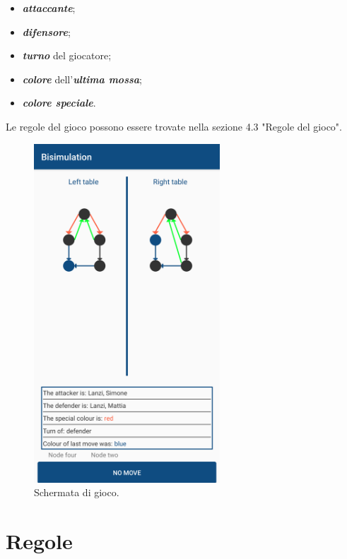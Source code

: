 \documentclass[a4paper,11pt,twoside,openright]{report}
\begin{document}
\begin{itemize}
\item \textbf\textit{attaccante};

\item \textbf\textit{difensore};

\item \textbf\textit{turno} del giocatore;

\item \textbf\textit{colore} dell'\textbf\textit{ultima mossa};

\item \textbf\textit{colore speciale}.
\end{itemize}

 Le regole del gioco possono essere trovate nella sezione 4.3 "Regole del gioco".

\begin{figure}[h]
\centering
\includegraphics[width=\linewidth,height=360pt,keepaspectratio]{images/Game.png}
\caption{Schermata di gioco.}
\end{figure}

\section{Regole}
\end{document}
